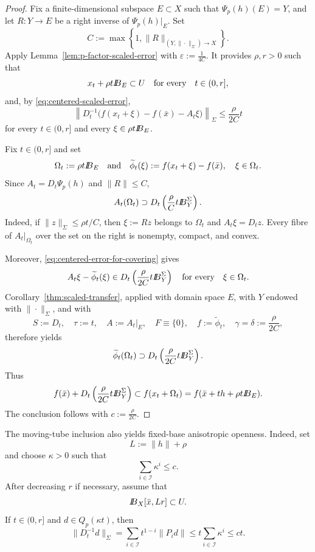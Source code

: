 \documentclass[11pt]{amsart}
\theoremstyle{definition}
\theoremstyle{remark}
\newcommand{\bx}{\bar x}
\def\ball{{I\kern -.35em B}}
\begin{document}
	\begin{proof}
		Fix a finite-dimensional subspace $E\subset X$ such that
		$\Psi_p(h)(E)=Y$, and let $R:Y\longrightarrow E$ be a right inverse of
		$\Psi_p(h)\vert_E$. Set
		$$
		C:=\max\left\{
		1,\|R\|_{(Y,\|\cdot\|_\Sigma)\to X}
		\right\}.
		$$
		Apply Lemma~\ref{lem:p-factor-scaled-error} with
		$ \varepsilon:=\tfrac{1}{4C}.$
		It provides $\rho,r>0$ such that
		$$
		x_t+\rho t\ball_E\subset U
		\quad\text{for every}\quad t\in(0,r],
		$$
		and, by \eqref{eq:centered-scaled-error},
		\begin{equation}
			\left\|D_t^{-1}
			\bigl(f(x_t+\xi)-f(\bx)-A_t\xi\bigr)
			\right\|_\Sigma
			\le \frac{\rho}{2C}t
			\label{eq:centered-error-for-covering}
		\end{equation}
		for every $t\in(0,r]$ and every $\xi\in\rho t\ball_E$.
		
		Fix $t\in(0,r]$ and set
		$$
		\Omega_t:=\rho t\ball_E
		\quad\text{and}\quad
		\widetilde\phi_t(\xi):=f(x_t+\xi)-f(\bx),
		\quad \xi\in\Omega_t.
		$$
		Since $A_t=D_t\Psi_p(h)$ and $\|R\|\le C$,
		$$
		A_t(\Omega_t)
		\supset
		D_t\left(\frac{\rho}{C}t\ball_Y^\Sigma\right).
		$$
		Indeed, if $\|z\|_\Sigma\le\rho t/C$, then
		$\xi:=Rz$ belongs to $\Omega_t$ and $A_t\xi=D_tz$.
		Every fibre of $A_t\vert_{\Omega_t}$ over the set on the right is
		nonempty, compact, and convex.
		
		Moreover, \eqref{eq:centered-error-for-covering} gives
		$$
		A_t\xi-\widetilde\phi_t(\xi)
		\in
		D_t\left(\frac{\rho}{2C}t\ball_Y^\Sigma\right)
		\quad\text{for every}\quad \xi\in\Omega_t.
		$$
		Corollary~\ref{thm:scaled-transfer}, applied with domain space $E$, with
		$Y$ endowed with $\|\cdot\|_\Sigma$, and with
		$$
		S:=D_t,\quad
		\tau:=t,\quad
		A:=A_t\vert_E,\quad
		F\equiv\{0\},\quad
		f:=\widetilde\phi_t,\quad
		\gamma=\delta:=\frac{\rho}{2C},
		$$
		therefore yields
		$$
		\widetilde\phi_t(\Omega_t)
		\supset
		D_t\left(\frac{\rho}{2C}t\ball_Y^\Sigma\right).
		$$
		Thus
		$$
		f(\bx)+D_t\left(\frac{\rho}{2C}t\ball_Y^\Sigma\right)
		\subset
		f(x_t+\Omega_t)
		=
		f(\bx+th+\rho t\ball_E).
		$$
		The conclusion follows with $c:=\frac{\rho}{2C}.$
	\end{proof}
	The moving-tube inclusion also yields fixed-base anisotropic openness.
	Indeed, set
	$$
	L:=\|h\|+\rho
	$$
	and choose $\kappa>0$ such that
	$$
	\sum_{i\in\mathcal I}\kappa^i\le c.
	$$
	After decreasing $r$ if necessary, assume that
	$$
	\ball_X[\bx,Lr]\subset U.
	$$
	If $t\in(0,r]$ and $d\in Q_p(\kappa t)$, then
	$$
	\|D_t^{-1}d\|_\Sigma
	=
	\sum_{i\in\mathcal I}t^{1-i}\|P_i d\|
	\le
	t\sum_{i\in\mathcal I}\kappa^i
	\le ct.
	$$
\end{document}
